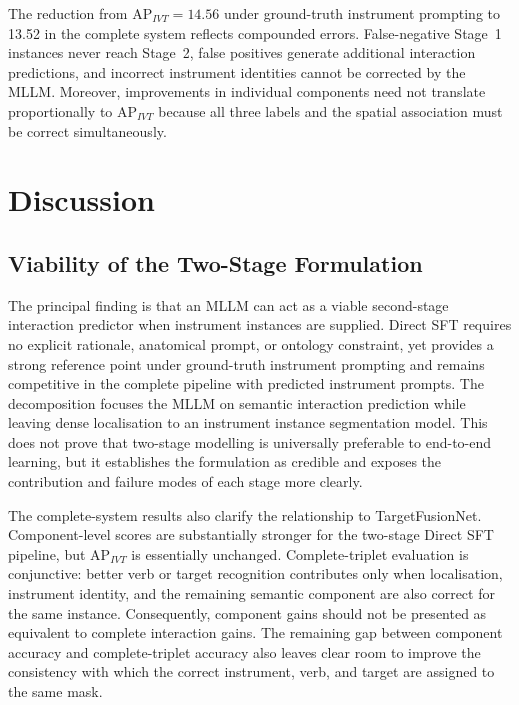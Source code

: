 The reduction from AP$_{IVT}=14.56$ under ground-truth instrument prompting to 13.52 in the complete system reflects compounded errors. False-negative Stage~1 instances never reach Stage~2, false positives generate additional interaction predictions, and incorrect instrument identities cannot be corrected by the MLLM. Moreover, improvements in individual components need not translate proportionally to AP$_{IVT}$ because all three labels and the spatial association must be correct simultaneously.

\begingroup
\cFiveSupplementfalse
\cFiveTrainingfalse
\cFiveErrorAnalysistrue

\endgroup

\section{Discussion}
\label{sec:c5:discussion}

\subsection{Viability of the Two-Stage Formulation}

The principal finding is that an MLLM can act as a viable second-stage interaction predictor when instrument instances are supplied. Direct SFT requires no explicit rationale, anatomical prompt, or ontology constraint, yet provides a strong reference point under ground-truth instrument prompting and remains competitive in the complete pipeline with predicted instrument prompts. The decomposition focuses the MLLM on semantic interaction prediction while leaving dense localisation to an instrument instance segmentation model. This does not prove that two-stage modelling is universally preferable to end-to-end learning, but it establishes the formulation as credible and exposes the contribution and failure modes of each stage more clearly.

The complete-system results also clarify the relationship to TargetFusionNet. Component-level scores are substantially stronger for the two-stage Direct SFT pipeline, but AP$_{IVT}$ is essentially unchanged. Complete-triplet evaluation is conjunctive: better verb or target recognition contributes only when localisation, instrument identity, and the remaining semantic component are also correct for the same instance. Consequently, component gains should not be presented as equivalent to complete interaction gains. The remaining gap between component accuracy and complete-triplet accuracy also leaves clear room to improve the consistency with which the correct instrument, verb, and target are assigned to the same mask.

